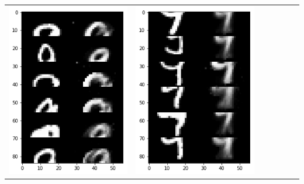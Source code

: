 \documentclass[12pt]{report} %
\begin{document}
\begin{tabular}{m{0.7cm}m{2.4cm}m{2.4cm}m{2.4cm}m{2.4cm}m{2.4cm}m{2.4cm}}
\includegraphics[scale=0.3]{pictures/M1_9_up.png} & \includegraphics[scale=0.3]{pictures/M1_9_down.png} &

\end{tabular}
\end{document}
